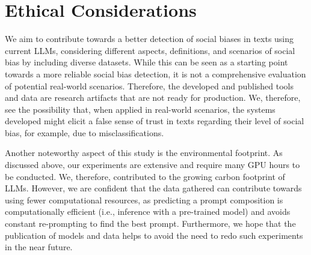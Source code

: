 \section*{Ethical Considerations}
\label{sec:ethical}

We aim to contribute towards a better detection of social biases in texts using current LLMs, considering different aspects, definitions, and scenarios of social bias by including diverse datasets. While this can be seen as a starting point towards a more reliable social bias detection, it is not a comprehensive evaluation of potential real-world scenarios. Therefore, the developed and published tools and data are research artifacts that are not ready for production. We, therefore, see the possibility that, when applied in real-world scenarios, the systems developed might elicit a false sense of trust in texts regarding their level of social bias, for example, due to misclassifications.

Another noteworthy aspect of this study is the environmental footprint. As discussed above, our experiments are extensive and require many GPU hours to be conducted. We, therefore, contributed to the growing carbon footprint of LLMs. However, we are confident that the data gathered can contribute towards using fewer computational resources, as predicting a prompt composition is computationally efficient (i.e., inference with a pre-trained model) and avoids constant re-prompting to find the best prompt. Furthermore, we hope that the publication of models and data helps to avoid the need to redo such experiments in the near future.
